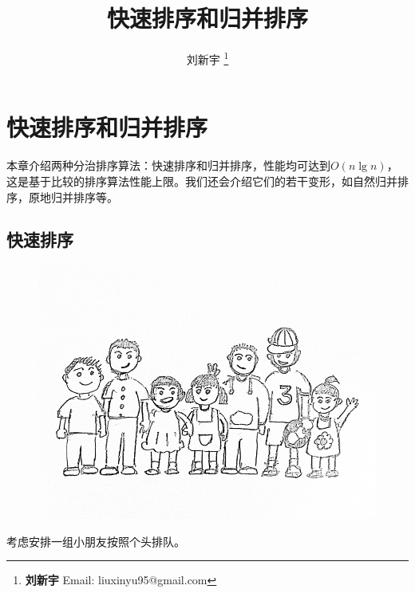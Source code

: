 \documentclass[b5paper]{ctexart}
\begin{document}
\title{快速排序和归并排序}

\author{刘新宇
\thanks{{\bfseries 刘新宇 } \newline
  Email: liuxinyu95@gmail.com \newline}
  }

\maketitle
\fi


\ifx\wholebook\relax
\chapter{快速排序和归并排序}
\fi

本章介绍两种分治排序算法：快速排序和归并排序，性能均可达到$O(n \lg n)$，这是基于比较的排序算法性能上限\cite{TAOCP}。我们还会介绍它们的若干变形，如自然归并排序，原地归并排序等。

\section{快速排序}

\begin{figure}[htbp]
 \centering
 \includegraphics[scale=0.3]{img/kids}
 \captionsetup{labelformat=empty}
 \label{fig:kids-sort}
\end{figure}

考虑安排一组小朋友按照个头排队。
\end{document}
